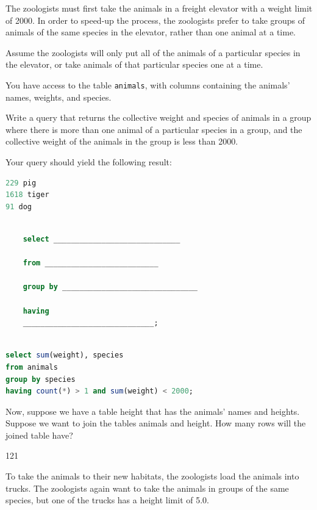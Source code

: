 \documentclass{exam}
\begin{document}
\begin{questions}
The zoologists must first take the animals in a freight elevator with a weight limit of 2000.  In order to speed-up the process, the zoologists prefer to take groups of animals of the same species in the elevator, rather than one animal at a time.  

Assume the zoologists will only put all of the animals of a particular species in the elevator, or take animals of that particular species one at a time.

You have access to the table \texttt{animals}, with columns containing the animals’ names, weights, and species.

Write a query that returns the collective weight and species of animals in a group where there is more than one animal of a particular species in a group, and the collective weight of the animals in the group is less than 2000.

Your query should yield the following result:

\begin{lstlisting}[language=SQL]
229 pig
1618 tiger
91 dog
\end{lstlisting}

\begin{lstlisting}[language=SQL]

    select _____________________________ 

    from __________________________

    group by _______________________________

    having 
    ______________________________;

\end{lstlisting}
\begin{solution}
\begin{lstlisting}[language=SQL]
 
select sum(weight), species
from animals
group by species
having count(*) > 1 and sum(weight) < 2000;
\end{lstlisting}
\end{solution}

\item Now, suppose we have a table height that has the animals' names and heights.  Suppose we want to join the tables animals and height.  How many rows will the joined table have?
\begin{solution}[2cm] 121 \end{solution}

\clearpage

\item To take the animals to their new habitats, the zoologists load the animals into trucks.  The zoologists again want to take the animals in groups of the same species, but one of the trucks has a height limit of 5.0.
 

\end{questions}
\end{document}
